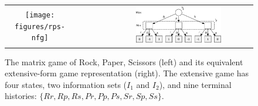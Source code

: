 \begin{figure}
\begin{center}
\begin{tabular}{ccc}
\texttt{[image: figures/rps-nfg]} & ~~~~~ & \includegraphics[width=0.6\textwidth]{figures/rps-new} \\
\end{tabular}
\end{center}
\caption{The matrix game of Rock, Paper, Scissors (left) and its equivalent extensive-form game representation (right). The extensive 
game has four states, two information sets ($I_1$ and $I_2$), 
and nine terminal histories: $\{ Rr, Rp, Rs, Pr, Pp, Ps, Sr, Sp, Ss \}$. \label{fig:rps-equiv}}
\end{figure}


